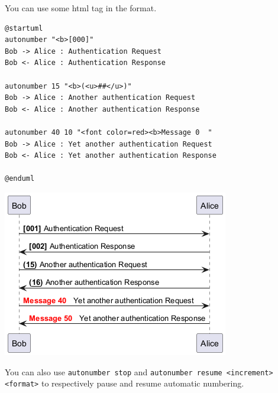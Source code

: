 You can use some html tag in the format.
\begin{verbatim}
@startuml
autonumber "<b>[000]"
Bob -> Alice : Authentication Request
Bob <- Alice : Authentication Response

autonumber 15 "<b>(<u>##</u>)"
Bob -> Alice : Another authentication Request
Bob <- Alice : Another authentication Response

autonumber 40 10 "<font color=red><b>Message 0  "
Bob -> Alice : Yet another authentication Request
Bob <- Alice : Yet another authentication Response

@enduml
\end{verbatim}
\begin{center}
\includegraphics[scale=0.60]{imgw/img-7fc6f31227ef57c7a3e87600375a7ed6.png}
\end{center}


You can also use \texttt{autonumber stop} and
\texttt{autonumber resume <increment> <format>} to respectively pause and resume
automatic numbering.


